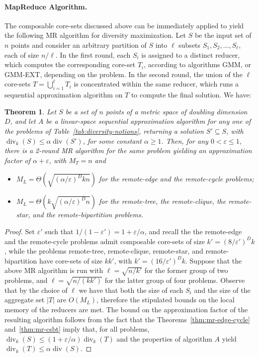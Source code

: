 \documentclass{article}
\newtheorem{theorem}{Theorem}
\DeclareMathOperator{\diversity}{div}
\renewcommand{\epsilon}{\varepsilon}
\newcommand{\BT}[1]{\Theta\left( #1 \right)}
\begin{document}
\paragraph{MapReduce Algorithm.}  The composable core-sets discussed above
can be immediately applied to yield the following MR algorithm
for diversity maximization.  Let $S$ be the input set of $n$ points
and consider an arbitrary partition of $S$ into $\ell$ subsets $S_1,
S_2, \ldots, S_\ell$, each of size $n/\ell$. In the first round, each
$S_i$ is assigned to a distinct reducer, which computes the
corresponding core-set $T_i$, according to algorithms {\sc GMM}, or
{\sc GMM-EXT}, depending on the problem. In the second round, the
union of the $\ell$ core-sets $T = \bigcup_{i=1}^{\ell}T_i$ is
concentrated within the same reducer, which runs a sequential
approximation algorithm on $T$ to compute the final solution.
We have:
\begin{theorem} \label{thm-2-rounds} Let $S$ be a set of $n$ points of
  a metric space of doubling dimension $D$, and let $A$ be a
  linear-space sequential approximation algorithm for any one of the
  problems of Table~\ref{tab:diversity-notions}, returning a solution
  $S'\subseteq S$, with $\diversity_k(S)\leq \alpha\diversity(S')$,
  for some constant $\alpha \geq 1$. Then, for any
  $0< \epsilon \le 1$, there is a 2-round MR algorithm for the same
  problem yielding an approximation factor of $\alpha+\epsilon$, with
  $M_T=n$ and
  \begin{itemize}
  \item $M_L=\BT{\sqrt{(\alpha/\epsilon)^Dkn}}$ for the remote-edge
    and the remote-cycle problems;
  \item $M_L=\BT{k\sqrt{(\alpha/\epsilon)^Dn}}$ for the remote-tree,
    the remote-clique, the remote-star, and the remote-bipartition
    problems.
  \end{itemize}
\end{theorem}
\begin{proof}
Set $\epsilon'$ such that $1/(1-\epsilon') = 1+ \epsilon/\alpha$, and
recall the the remote-edge and the remote-cycle problems admit
composable core-sets of size $k'=(8/\epsilon')^Dk$, while the problems
remote-tree, remote-clique, remote-star, and remote-bipartition have
core-sets of size $kk'$, with $k'=(16/\epsilon')^D k$.  Suppose that
the above MR algorithm is run with $\ell = \sqrt{n/k'}$ for the former
group of two problems, and $\ell = \sqrt{n/(kk')}$ for the latter
group of four problems.  Observe that by the choice of $\ell$ we have
that both the size of each $S_i$ and the size of the aggregate set
$|T|$ are $O(M_L)$, therefore the stipulated bounds on the local
memory of the reducers are met. The bound on the approximation factor
of the resulting algorithm follows from the fact that the
Theorems~\ref{thm:mr-edge-cycle} and~\ref{thm:mr-csbt} imply that, for
all problems, $\diversity_k(S) \leq
(1+\epsilon/\alpha)\diversity_k(T)$ and the properties of algorithm
$A$ yield $\diversity_k(T)\leq \alpha\diversity(S)$.
\end{proof}
\end{document}
